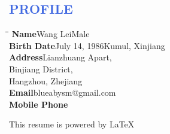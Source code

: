 \documentclass{res}
\begin{document}
\begin{resume}
\textcolor{RoyalBlue}{
\section{PROFILE}
}
\vspace{-0.1in}

\begin{tabbing}
  \hspace{1.5in}\= \hspace{1.5in}\= \hspace{1.5in}\= \hspace{1.5in}\= \kill
         {\bf Name}\>Wang Lei\>Male\\
         {\bf Birth Date}\>July 14, 1986\>Kumul, Xinjiang\\
         {\bf Address}\>Lianzhuang Apart,\\
         \>Binjiang District,\\
         \>Hangzhou, Zhejiang\\
                   {\bf Email}\>blueabysm@gmail.com\\
                   {\bf Mobile Phone}\\
                   \end{tabbing}
\vspace{-20pt}

\begin{flushright}
  This resume is powered by \LaTeX\\
\end{flushright}
\end{resume}
\end{document}
